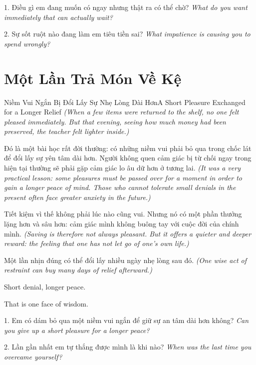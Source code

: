 \begin{tuhocnhanh}
1. Điều gì em đang muốn có ngay nhưng thật ra có thể chờ? \textit{What do you want immediately that can actually wait?}

2. Sự sốt ruột nào đang làm em tiêu tiền sai? \textit{What impatience is causing you to spend wrongly?}
\end{tuhocnhanh}
\ngancach

\section{Một Lần Trả Món Về Kệ}
\begin{truyen}{Niềm Vui Ngắn Bị Đổi Lấy Sự Nhẹ Lòng Dài Hơn}{A Short Pleasure Exchanged for a Longer Relief}
\textit{(When a few items were returned to the shelf, no one felt pleased immediately. But that evening, seeing how much money had been preserved, the teacher felt lighter inside.)}

Đó là một bài học rất đời thường: có những niềm vui phải bỏ qua trong chốc lát để đổi lấy sự yên tâm dài hơn. Người không quen cảm giác bị từ chối ngay trong hiện tại thường sẽ phải gặp cảm giác lo âu dữ hơn ở tương lai.
\textit{(It was a very practical lesson: some pleasures must be passed over for a moment in order to gain a longer peace of mind. Those who cannot tolerate small denials in the present often face greater anxiety in the future.)}

Tiết kiệm vì thế không phải lúc nào cũng vui. Nhưng nó có một phần thưởng lặng hơn và sâu hơn: cảm giác mình không buông tay với cuộc đời của chính mình.
\textit{(Saving is therefore not always pleasant. But it offers a quieter and deeper reward: the feeling that one has not let go of one’s own life.)}
\end{truyen}

\begin{baihoc}
Một lần nhịn đúng có thể đổi lấy nhiều ngày nhẹ lòng sau đó.
\textit{(One wise act of restraint can buy many days of relief afterward.)}
\end{baihoc}

\begin{ghinhoanh}
Short denial, longer peace.

That is one face of wisdom.
\end{ghinhoanh}

\begin{tuhocnhanh}
1. Em có dám bỏ qua một niềm vui ngắn để giữ sự an tâm dài hơn không? \textit{Can you give up a short pleasure for a longer peace?}

2. Lần gần nhất em tự thắng được mình là khi nào? \textit{When was the last time you overcame yourself?}
\end{tuhocnhanh}

